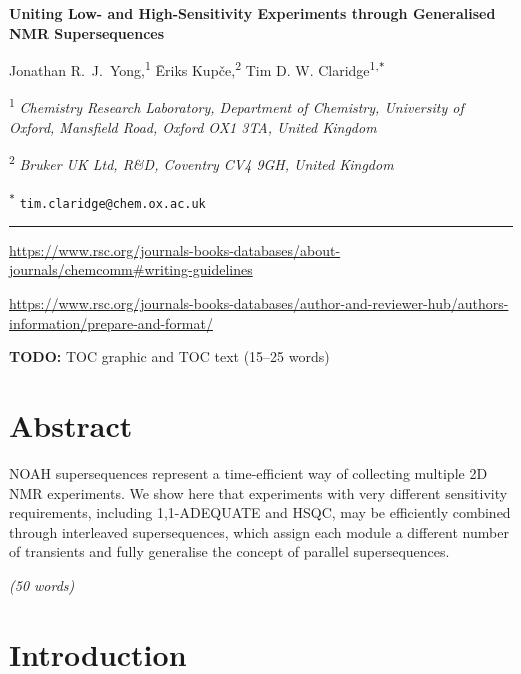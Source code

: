 \documentclass[a4paper,12pt]{article}
\newcommand{\me}{Jonathan R.\ J.\ Yong}
\newcommand{\eriks}{{\=E}riks Kup{\v{c}}e}
\newcommand{\tim}{Tim D. W. Claridge}
\newcommand{\articletitle}{\todo{Uniting Low- and High-Sensitivity Experiments through Generalised NMR Supersequences}}
\newcommand{\crl}{Chemistry Research Laboratory, Department of Chemistry, University of Oxford, Mansfield Road, Oxford OX1 3TA, United Kingdom}
\newcommand{\turing}{The Alan Turing Institute, The British Library, 96 Euston Road, London NW1 2DB, United Kingdom}
\newcommand{\brukeruk}{Bruker UK Ltd, R\&D, Coventry CV4 9GH, United Kingdom}
\newcommand{\exscientia}{Exscientia Ltd, The Schr{\"o}dinger Building, Oxford Science Park, Oxford OX4 4GE, United Kingdom}
\newcommand{\todo}[1]{{\color{OrangeRed}#1}}
\begin{document}
 \begin{refsection}

\begin{center}   %
    \textbf{\Large \articletitle{}}

    \vspace{0.2cm}

    \me{},\textsuperscript{1} \eriks{},\textsuperscript{2} \tim\textsuperscript{1,\texttt{*}}

    \vspace{0.2cm}

    \small

    \textsuperscript{1} \textit{\crl{}}


    \textsuperscript{2} \textit{\brukeruk{}}


    \normalsize \textsuperscript{\texttt{*}} \texttt{tim.claridge@chem.ox.ac.uk}

    \vspace{0.5cm} \hrule

\end{center}

\small{
    \url{https://www.rsc.org/journals-books-databases/about-journals/chemcomm#writing-guidelines}

    \url{https://www.rsc.org/journals-books-databases/author-and-reviewer-hub/authors-information/prepare-and-format/}
}

\todo{\textbf{TODO:} TOC graphic and TOC text (15--25 words)}

\section*{Abstract}

NOAH supersequences represent a time-efficient way of collecting multiple 2D NMR experiments. 
We show here that experiments with very different sensitivity requirements, including 1,1-ADEQUATE and HSQC, may be efficiently combined through interleaved supersequences, which assign each module a different number of transients and fully generalise the concept of parallel supersequences.

\textit{(50 words)}

\section{Introduction}


\end{refsection}
\end{document}
